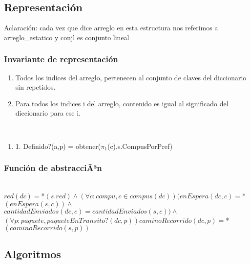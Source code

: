 \subsection{Representaci\'on}


Aclaraci\'on: cada vez que dice arreglo en esta estructura nos referimos a arreglo\_estatico y conjl es conjunto lineal

\subsubsection*{Invariante de representaci\'on}

\begin{enumerate}
  \item Todos los indices del arreglo, pertenecen al conjunto de claves del diccionario   
		sin repetidos.
  \item Para todos los indices i del arreglo, contenido es igual al significado del   
		diccionario para ese i. 
\end{enumerate}

  \\
\begin{enumerate}
 \item 1.  Definido?(a,p) = obtener($\pi_1$(c),s.CompusPorPref)
\end{enumerate}


\subsubsection*{Funci\'on de abstracciÃ³n}

 \\
$red(dc)=$*$(s.red) \land (\forall c:compu, c\in compus(dc))( enEspera(dc,c)=$*$(enEspera(s,c)) \land$ \\
$  cantidadEnviados(dc,c)=cantidadEnviados(s,c)) \land $ \\ 
$(\forall p:paquete,paqueteEnTransito?(dc,p)) caminoRecorrido(dc,p)=$*$(caminoRecorrido(s,p)) $

\subsection{Algoritmos}

